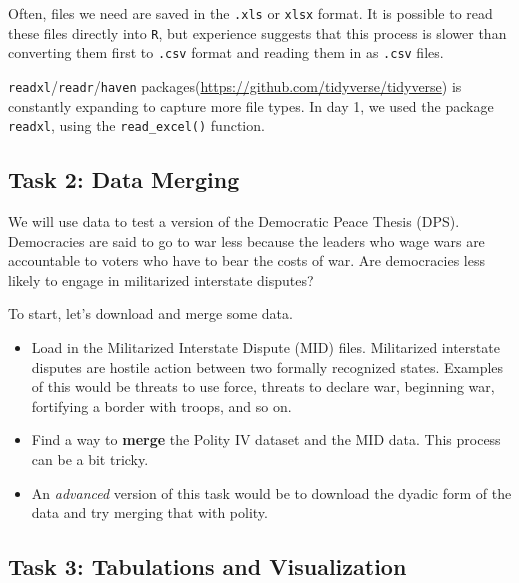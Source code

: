 \documentclass[
]{book}
\providecommand{\tightlist}{%
  \setlength{\itemsep}{0pt}\setlength{\parskip}{0pt}}
\theoremstyle{definition}
\theoremstyle{definition}
\theoremstyle{definition}
\theoremstyle{remark}
\begin{document}
Often, files we need are saved in the \texttt{.xls} or \texttt{xlsx} format. It is possible to read these files directly into \texttt{R}, but experience suggests that this process is slower than converting them first to \texttt{.csv} format and reading them in as \texttt{.csv} files.

\texttt{readxl}/\texttt{readr}/\texttt{haven} packages(\url{https://github.com/tidyverse/tidyverse}) is constantly expanding to capture more file types. In day 1, we used the package \texttt{readxl}, using the \texttt{read\_excel()} function.

\hypertarget{task-2-data-merging}{%
\subsection*{Task 2: Data Merging}\label{task-2-data-merging}}

We will use data to test a version of the Democratic Peace Thesis (DPS). Democracies are said to go to war less because the leaders who wage wars are accountable to voters who have to bear the costs of war. Are democracies less likely to engage in militarized interstate disputes?

To start, let's download and merge some data.

\begin{itemize}
\tightlist
\item
  Load in the Militarized Interstate Dispute (MID) files. Militarized interstate disputes are hostile action between two formally recognized states. Examples of this would be threats to use force, threats to declare war, beginning war, fortifying a border with troops, and so on.
\item
  Find a way to \textbf{merge} the Polity IV dataset and the MID data. This process can be a bit tricky.
\item
  An \emph{advanced} version of this task would be to download the dyadic form of the data and try merging that with polity.
\end{itemize}

\hypertarget{task-3-tabulations-and-visualization}{%
\subsection*{Task 3: Tabulations and Visualization}\label{task-3-tabulations-and-visualization}}
\end{document}
